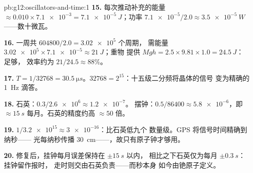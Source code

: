 \begin{solution}{pb:g12:oscillators-and-time:1}
\textbf{15.} 每次推动补充的能量 $\approx 0.010 \times \num{7.1e-3} =
\qty{7.1e-5}{J}$；功率 $\num{7.1e-5}/2.0 \approx \qty{3.5e-5}{W}$
——数十微瓦。

\textbf{16.} 一周共 $604800/2.0 = \num{3.02e5}$ 个周期，
需能量 $\num{3.02e5} \times \num{7.1e-5} \approx \qty{21}{J}$；重物
提供 $Mgh = 2.5 \times 9.81 \times 1.0 = \qty{24.5}{J}$：足够，
效率约为 $21/24.5 \approx 88\%$。

\textbf{17.} $T = 1/\num{32768} = \qty{30.5}{\micro s}$。$\num{32768}
= 2^{15}$：十五级二分频将晶体的信号
变为精确的 \qty{1}{Hz} 滴答。

\textbf{18.} 石英：$0.3/\num{2.6e6} \approx \num{1.2e-7}$。
摆钟：$0.5/86400 \approx \num{5.8e-6}$，即 $\approx
\qty{15}{s}$ 每月。石英的精度约高 $\approx 50$ 倍。

\textbf{19.} $1/\num{3.2e15} \approx \num{3e-16}$：比石英低九个
数量级。GPS 将信号时间精确到纳秒——
光每纳秒传播 \qty{30}{cm}——，故只有原子钟才够用。

\textbf{20.} 修复后，挂钟每月误差保持在 $\pm\qty{15}{s}$ 以内，
相比之下石英仅为每月 $\pm\qty{0.3}{s}$：挂钟留作报时，
走时则交由石英负责——而秒本身
如今由铯原子定义。
\end{solution}
